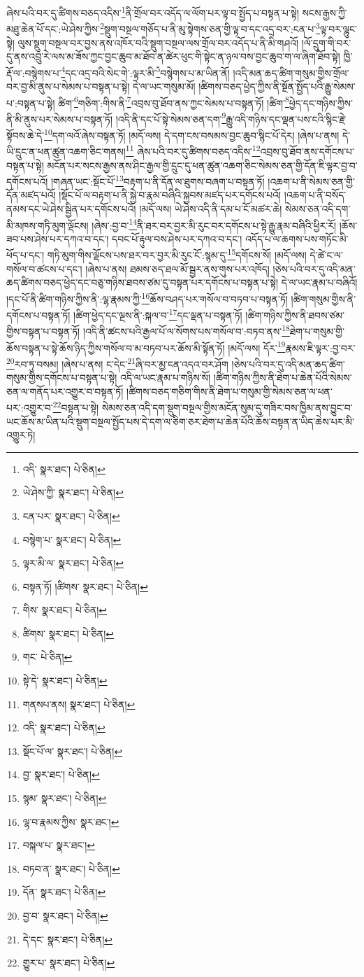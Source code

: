 ཞེས་པའི་བར་དུ་ཚིགས་བཅད་འདིས་\footnote{འདི་  སྣར་ཐང་།  པེ་ཅིན། }ནི་གྲོལ་བར་འདོད་ལ་ལོག་པར་ལྟ་བ་སྤྱོད་པ་བསྟན་པ་སྟེ། སངས་རྒྱས་ཀྱི་མཐུ་ཆེན་པོ་དང་:ཡེ་ཤེས་ཀྱིས་\footnote{ཡེ་ཤེས་ཀྱི་  སྣར་ཐང་།  པེ་ཅིན། }སྡུག་བསྔལ་གཅོད་པ་ནི་མུ་སྟེགས་ཅན་གྱི་ལྟ་བ་དང་འདྲ་བར་:ངན་པ་\footnote{ངན་པར་  སྣར་ཐང་།  པེ་ཅིན། }ལྟ་བར་ལྷུང་སྟེ། ལུས་སྡུག་བསྔལ་བར་བྱས་ནས་འཁོར་བའི་སྡུག་བསྔལ་ལས་གྲོལ་བར་འདོད་པ་ནི་མི་གཤའོ། །ལོ་དྲུག་གི་བར་དུ་ནས་འབྲུ་རེ་ལས་མ་ཟོས་ཀྱང་བྱང་ཆུབ་མ་ཐོབ་ན་ཚེར་ཕུང་གི་སྟེང་ན་ཉལ་བས་བྱང་ཆུབ་ག་ལ་ཞིག་ཐོབ་སྟེ། ཁྱི་རྡོ་ལ་:བསྙེགས་པ་\footnote{བསྙེག་པ་  སྣར་ཐང་།  པེ་ཅིན། }དང་འདྲ་བའི་སེང་གེ་:ལྟར་མི་\footnote{ལྟར་མི་ལ་  སྣར་ཐང་།  པེ་ཅིན། }བསྙེགས་པ་མ་ཡིན་ནོ། །འདི་མན་ཆད་ཚིག་གསུམ་གྱིས་གྲོལ་བར་བྱ་མི་ནུས་པ་སེམས་པ་བསྟན་པ་སྟེ། དེ་ལ་ཡང་གསུམ་མོ། །ཚིགས་བཅད་ཕྱེད་ཀྱིས་ནི་སྔོན་སྤྱོད་པའི་རྒྱུ་སེམས་པ་:བསྟན་པ་སྟེ། ཚིག་\footnote{བསྟན་ཏོ། །ཚིགས་  སྣར་ཐང་།  པེ་ཅིན། }གཅིག་:གིས་ནི་\footnote{གིས་  སྣར་ཐང་།  པེ་ཅིན། }འབྲས་བུ་ཐོབ་ནས་ཀྱང་སེམས་པ་བསྟན་ཏོ། །ཚིག་\footnote{ཚིགས་  སྣར་ཐང་།  པེ་ཅིན། }ཕྱེད་དང་གཉིས་ཀྱིས་ནི་མི་ནུས་པར་སེམས་པ་བསྟན་ཏོ། །འདི་ནི་དང་པོ་སྟེ་སེམས་ཅན་དག་\footnote{གང་  པེ་ཅིན། }རྒྱུ་འདི་གཉིས་དང་ལྡན་པས་ངའི་སྙིང་རྗེ་སྟོབས་ཆེ་དེ་\footnote{སྟེ་དེ་  སྣར་ཐང་།  པེ་ཅིན། }དག་ལའོ་ཞེས་བསྟན་ཏོ། །མདོ་ལས། དེ་དག་ངས་བསམས་བྱང་ཆུབ་སྙིང་པོ་དེར། །ཞེས་པ་ནས། དེ་ཡི་དྲུང་ན་ཕན་ཚུན་འཆག་ཅིང་གནས།\footnote{གནསཔ་ནས།  སྣར་ཐང་།  པེ་ཅིན། } ཞེས་པའི་བར་དུ་ཚིགས་བཅད་འདིས་\footnote{འདི་  སྣར་ཐང་།  པེ་ཅིན། }འབྲས་བུ་ཐོབ་ནས་དགོངས་པ་བསྟན་པ་སྟེ། མངོན་པར་སངས་རྒྱས་ནས་ཤིང་རྒྱལ་གྱི་དྲུང་དུ་ཕན་ཚུན་འཆག་ཅིང་སེམས་ཅན་གྱི་དོན་ཇི་ལྟར་བྱ་བ་དགོངས་པའོ། །གཞན་ཡང་:སྡོང་པོ་\footnote{སྡོང་པོ་ལ་  སྣར་ཐང་།  པེ་ཅིན། }བརྟག་པ་ནི་དོན་ལ་ཐུགས་བཞག་པ་བསྟན་ཏོ། །འཆག་པ་ནི་སེམས་ཅན་གྱི་དོན་མཛད་པའོ། །སྡོང་པོ་ལ་བརྟག་པ་ནི་སྐྱེ་བ་རྣམ་བཞིའི་སྐྱབས་མཛད་པར་དགོངས་པའོ། །འཆག་པ་ནི་བསོད་ནམས་དང་ཡེ་ཤེས་སྦྱིན་པར་དགོངས་པའོ། །མདོ་ལས། ཡེ་ཤེས་འདི་ནི་དམ་པ་ངོ་མཚར་ཆེ། སེམས་ཅན་འདི་དག་མི་མཁས་གཏི་མུག་ལྡོངས། །ཞེས་:བྱ་བ་\footnote{བྱ་  སྣར་ཐང་།  པེ་ཅིན། }ནི་ཐར་བར་བྱར་མི་རུང་བར་དགོངས་པ་སྟེ་རྒྱུ་རྣམ་བཞིའི་ཕྱིར་རོ། །ཆོས་ཟབ་པས་ཤེས་པར་དཀའ་བ་དང་། དབང་པོ་རྟུལ་བས་ཤེས་པར་དཀའ་བ་དང་། འདོད་པ་ལ་ཆགས་པས་གཏོང་མི་ཕོད་པ་དང་། གཏི་མུག་གིས་ལྡོངས་པས་ཐར་བར་བྱར་མི་རུང་ངོ་:སྙམ་དུ་\footnote{སྙམ་  སྣར་ཐང་།  པེ་ཅིན། }དགོངས་སོ། །མདོ་ལས། དེ་ཚེ་ང་ལ་གསོལ་བ་ཚངས་པ་དང་། །ཞེས་པ་ནས། ཐམས་ཅད་ཐལ་མོ་སྦྱར་ནས་གུས་པར་འཁོད། །ཅེས་པའི་བར་དུ་འདི་མན་ཆད་ཚིགས་བཅད་ཕྱེད་དང་བཅུ་གཉིས་ཐབས་ཙམ་དུ་བསྟན་པར་དགོངས་པ་བསྟན་པ་སྟེ། དེ་ལ་ཡང་རྣམ་པ་བཞིའོ། །དང་པོ་ནི་ཚིག་གཉིས་ཀྱིས་ནི་:ལྷ་རྣམས་ཀྱི་\footnote{ལྷ་བ་རྣམས་ཀྱིས་  སྣར་ཐང་། }ཆོས་བཤད་པར་གསོལ་བ་བཏབ་པ་བསྟན་ཏོ། །ཚིག་གསུམ་གྱིས་ནི་དགོངས་པ་བསྟན་ཏོ། །ཚིག་ཕྱེད་དང་ལྔས་ནི་:སྐལ་བ་\footnote{བསྐལ་པ་  སྣར་ཐང་། }དང་ལྡན་པ་བསྟན་ཏོ། །ཚིག་གཉིས་ཀྱིས་ནི་ཐབས་ཙམ་གྱིས་བསྟན་པ་བསྟན་ཏོ། །འདི་ནི་ཚངས་པའི་རྒྱལ་པོ་ལ་སོགས་པས་གསོལ་བ་:བཏབ་ནས་\footnote{བཏབ་ན་  སྣར་ཐང་།  པེ་ཅིན། }ཐེག་པ་གསུམ་གྱི་ཆོས་བསྟན་པ་སྟེ་ཆོས་ཉིད་ཀྱིས་གསོལ་བ་མ་བཏབ་པར་ཆོས་མི་སྟོན་ཏོ། །མདོ་ལས། དོར་\footnote{དོན་  སྣར་ཐང་།  པེ་ཅིན། }རྣམས་ཇི་ལྟར་:བྱ་བར་\footnote{བྱ་བ་  སྣར་ཐང་།  པེ་ཅིན། }རབ་ཏུ་བསམ། །ཞེས་པ་ནས། ང་དེང་\footnote{དེ་དང་  སྣར་ཐང་།  པེ་ཅིན། }ཞི་བར་མྱ་ངན་འདའ་བར་ཤོག །ཅེས་པའི་བར་དུ་འདི་མན་ཆད་ཚིག་གསུམ་གྱིས་དགོངས་པ་བསྟན་པ་སྟེ། འདི་ལ་ཡང་རྣམ་པ་གཉིས་སོ། །ཚིག་གཉིས་ཀྱིས་ནི་ཐེག་པ་ཆེན་པོའི་སེམས་ཅན་ལ་གནོད་པར་འགྱུར་བ་བསྟན་ཏོ། །ཚིགས་བཅད་གཅིག་གིས་ནི་ཐེག་པ་གསུམ་གྱི་སེམས་ཅན་ལ་ཕན་པར་:འགྱུར་བ་\footnote{གྱུར་པ་  སྣར་ཐང་།  པེ་ཅིན། }བསྟན་པ་སྟེ། སེམས་ཅན་འདི་དག་སྡུག་བསྔལ་གྱིས་མངོན་སུམ་དུ་གཟིར་བས་ཁྱིམ་ནས་བྱུང་བ་ཡང་ཆོས་མ་ཡིན་པའི་སྡུག་བསྔལ་སྤྱོད་པས་དེ་དག་ལ་ཅིག་ཅར་ཐེག་པ་ཆེན་པོའི་ཆོས་བསྟན་ན་ཡིད་ཆེས་པར་མི་འགྱུར་ཏེ། 